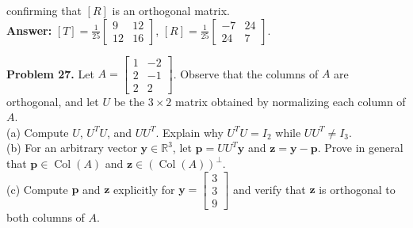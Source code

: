 \documentclass[11pt, letterpaper]{article}
\theoremstyle{definition}
\theoremstyle{remark}
\begin{document}
confirming that $[R]$ is an orthogonal matrix. \\
\textbf{Answer:} $[T] = \frac{1}{25}\begin{bmatrix} 9 & 12 \\ 12 & 16 \end{bmatrix}$, $[R] = \frac{1}{25}\begin{bmatrix} -7 & 24 \\ 24 & 7 \end{bmatrix}$.

\textbf{Problem 27.} Let $A = \begin{bmatrix} 1 & -2 \\ 2 & -1 \\ 2 & 2 \end{bmatrix}$. Observe that the columns of $A$ are orthogonal, and let $U$ be the $3 \times 2$ matrix obtained by normalizing each column of $A$. \\
(a) Compute $U$, $U^T U$, and $U U^T$. Explain why $U^T U = I_2$ while $U U^T \neq I_3$. \\
(b) For an arbitrary vector $\mathbf{y} \in \mathbb{R}^3$, let $\mathbf{p} = U U^T \mathbf{y}$ and $\mathbf{z} = \mathbf{y} - \mathbf{p}$. Prove in general that $\mathbf{p} \in \operatorname{Col}(A)$ and $\mathbf{z} \in (\operatorname{Col}(A))^\perp$. \\
(c) Compute $\mathbf{p}$ and $\mathbf{z}$ explicitly for $\mathbf{y} = \begin{bmatrix} 3 \\ 3 \\ 9 \end{bmatrix}$ and verify that $\mathbf{z}$ is orthogonal to both columns of $A$.
\end{document}
